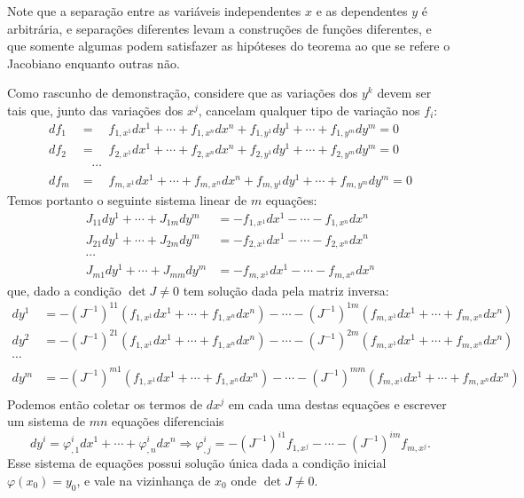 \documentclass[a4paper, 12pt]{article}
\theoremstyle{definition}
\theoremstyle{definition}
\begin{document}
Note que a separação entre as variáveis independentes $x$ e as dependentes $y$ é arbitrária, e separações
diferentes levam a construções de funções diferentes, e que somente algumas podem satisfazer as hipóteses
do teorema ao que se refere o Jacobiano enquanto outras não.

Como rascunho de demonstração, considere que as variações dos $y^k$ devem ser tais que, junto das variações
dos $x^j$, cancelam qualquer tipo de variação nos $f_i$:
\begin{align*}
    df_1&=\quad f_{1,x^1}dx^1+\cdots+f_{1,x^n}dx^n+f_{1,y^1}dy^1+\cdots+f_{1,y^m}dy^m=0\\
    df_2&=\quad f_{2,x^1}dx^1+\cdots+f_{2,x^n}dx^n+f_{2,y^1}dy^1+\cdots+f_{2,y^m}dy^m=0\\
    &\quad\cdots\\
    df_m&=\quad f_{m,x^1}dx^1+\cdots+f_{m,x^n}dx^n+f_{m,y^1}dy^1+\cdots+f_{m,y^m}dy^m=0
\end{align*}
Temos portanto o seguinte sistema linear de $m$ equações:
\begin{align*}
    J_{11}dy^1+\cdots+J_{1m}dy^m&=-f_{1,x^1}dx^1-\cdots-f_{1,x^n}dx^n\\
    J_{21}dy^1+\cdots+J_{2m}dy^m&=-f_{2,x^1}dx^1-\cdots-f_{2,x^n}dx^n\\
    \cdots&\\
    J_{m1}dy^1+\cdots+J_{mm}dy^m&=-f_{m,x^1}dx^1-\cdots-f_{m,x^n}dx^n
\end{align*}
que, dado a condição $\det J\neq0$ tem solução dada pela matriz inversa:
\begin{align*}
    dy^1&=-(J^{-1})^{11}\left(f_{1,x^1}dx^1+\cdots+f_{1,x^n}dx^n\right)-
    \cdots-(J^{-1})^{1m}\left(f_{m,x^1}dx^1+\cdots+f_{m,x^n}dx^n\right)\\
    dy^2&=-(J^{-1})^{21}\left(f_{1,x^1}dx^1+\cdots+f_{1,x^n}dx^n\right)-
    \cdots-(J^{-1})^{2m}\left(f_{m,x^1}dx^1+\cdots+f_{m,x^n}dx^n\right)\\
    \cdots&\\
    dy^m&=-(J^{-1})^{m1}\left(f_{1,x^1}dx^1+\cdots+f_{1,x^n}dx^n\right)-
    \cdots-(J^{-1})^{mm}\left(f_{m,x^1}dx^1+\cdots+f_{m,x^n}dx^n\right)\\
\end{align*}
Podemos então coletar os termos de $dx^j$ em cada uma destas equações e escrever um sistema de $mn$ equações 
diferenciais
$$dy^i=\varphi^i_{,1}dx^1+\cdots+\varphi^i_{,n}dx^n
\Rightarrow\varphi^i_{,j}=-(J^{-1})^{i1}f_{1,x^j}-\cdots-(J^{-1})^{im}f_{m,x^j}.$$
Esse sistema de equações possui solução única dada a condição inicial $\varphi(x_0)=y_0$, e vale na
vizinhança de $x_0$ onde $\det J\neq0$.
\end{document}

